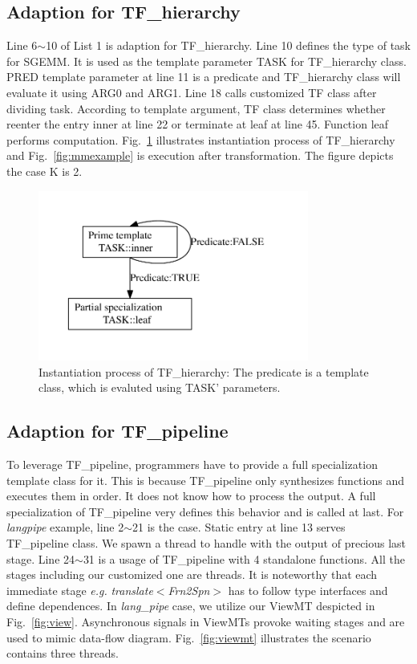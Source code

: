\subsection{Adaption for TF\_hierarchy}
Line 6$\sim$10 of List 1 is adaption for TF\_hierarchy. Line 10
defines the type of task for SGEMM. It is used as
the template parameter TASK for TF\_hierarchy class. PRED template
parameter at line 11 is a predicate and TF\_hierarchy class will
evaluate it using ARG0 and ARG1. Line 18 calls customized TF class after dividing
task. According to template argument, TF class determines whether
reenter the entry inner at line 22 or terminate at leaf at
line 45. Function leaf performs computation. Fig.~\ref{fig:hierarchy} illustrates
instantiation process of TF\_hierarchy and Fig.~\ref{fig:mmexample} is
execution after transformation. The figure depicts the case K is 2.

\begin{figure}[hpt]
\includegraphics[width=3.5in]{../algo}
\caption{Instantiation process of TF\_hierarchy: The predicate is a template
class, which is evaluted using TASK' parameters.}\label{fig:hierarchy}
\end{figure}

\subsection{Adaption for TF\_pipeline}
To leverage TF\_pipeline, programmers have to provide a full
specialization template class for it. This is because TF\_pipeline
only synthesizes functions and executes them in order. It does not
know how to process the output. A full specialization of TF\_pipeline very defines
this behavior and is called at last. For \textit{langpipe} example,
line 2$\sim$21 is the case. Static entry at line 13 serves TF\_pipeline class. We spawn a thread to handle with the output of
precious last stage. Line 24$\sim$31 is a usage of TF\_pipeline with 4
standalone functions. All the stages including our customized one are
threads. It is noteworthy that each immediate stage \textit{e.g.}
\textit{translate$<$Frn2Spn$>$} has to follow type interfaces and
define dependences. In \textit{lang\_pipe} case, we utilize our ViewMT
despicted in Fig.~\ref{fig:view}. Asynchronous signals in ViewMTs provoke waiting
stages and are used to mimic data-flow diagram. Fig.~\ref{fig:viewmt} illustrates the scenario contains three
threads.

